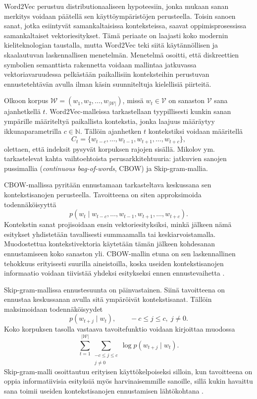 Word2Vec perustuu distributionaaliseen hypoteesiin, jonka mukaan sanan merkitys
voidaan päätellä sen käyttöympäristöjen perusteella. Toisin sanoen sanat, jotka
esiintyvät samankaltaisissa konteksteissa, saavat oppimisprosessissa
samankaltaiset vektoriesitykset. Tämä periaate on laajasti koko modernin
kieliteknologian taustalla, mutta Word2Vec teki siitä käytännöllisen ja
skaalautuvan laskennallisen menetelmän. Menetelmä osoitti, että diskreettien
symbolien semanttista rakennetta voidaan mallintaa jatkuvassa vektoriavaruudessa
pelkästään paikallisiin konteksteihin perustuvan ennustetehtävän avulla ilman
käsin suunniteltuja kielellisiä piirteitä.

Olkoon korpus \(\mathcal{W} = (w_1, w_2, \dots, w_{|\mathcal{W}|})\), missä \(w_t \in \mathcal{V}\) on
sanaston \(\mathcal{V}\) sana ajanhetkellä \(t\). Word2Vec-malleissa tarkastellaan
tyypillisesti kunkin sanan ympärille määriteltyä paikallista kontekstia, jonka
laajuus määräytyy ikkunaparametrilla \(c \in \mathbb{N}\). Tällöin ajanhetken
\(t\) kontekstiksi voidaan määritellä
$$
C_t = \{w_{t-c}, \dots, w_{t-1}, w_{t+1}, \dots, w_{t+c}\},
$$
olettaen, että indeksit pysyvät korpuksen rajojen sisällä. Mikolov ym.\
\cite{mikolov2013efficient} tarkastelevat kahta vaihtoehtoista
perusarkkitehtuuria: jatkuvien sanojen pussimallia
(\emph{continuous bag-of-words}, CBOW) ja Skip-gram-mallia.

CBOW-mallissa pyritään ennustamaan tarkasteltava keskussana sen
kontekstisanojen perusteella. Tavoitteena on siten approksimoida
todennäköisyyttä
$$
p(w_t \mid w_{t-c}, \dots, w_{t-1}, w_{t+1}, \dots, w_{t+c}).
$$
Kontekstin sanat projisoidaan ensin vektoriesityksiksi, minkä jälkeen nämä
esitykset yhdistetään tavallisesti summaamalla tai keskiarvoistamalla.
Muodostettua kontekstivektoria käytetään tämän jälkeen kohdesanan
ennustamiseen koko sanaston yli. CBOW-mallin etuna on sen laskennallinen
tehokkuus erityisesti suurilla aineistoilla, koska useiden kontekstisanojen
informaatio voidaan tiivistää yhdeksi esitykseksi ennen ennustevaihetta
\cite{mikolov2013efficient}.

Skip-gram-mallissa ennustesuunta on päinvastainen. Siinä tavoitteena on
ennustaa keskussanan avulla sitä ympäröivät kontekstisanat. Tällöin
maksimoidaan todennäköisyydet
$$
p(w_{t+j} \mid w_t),
\qquad
-c \le j \le c,\; j \ne 0.
$$
Koko korpuksen tasolla vastaava tavoitefunktio voidaan kirjoittaa muodossa
$$
\sum_{t=1}^{|\mathcal{W}|} \sum_{\substack{-c \le j \le c \\ j \ne 0}}
\log p(w_{t+j} \mid w_t).
$$
Skip-gram-malli osoittautuu erityisen käyttökelpoiseksi silloin, kun tavoitteena
on oppia informatiivisia esityksiä myös harvinaisemmille sanoille, sillä kukin
havaittu sana toimii useiden kontekstisanojen ennustamisen lähtökohtana
\cite{mikolov2013efficient}.

